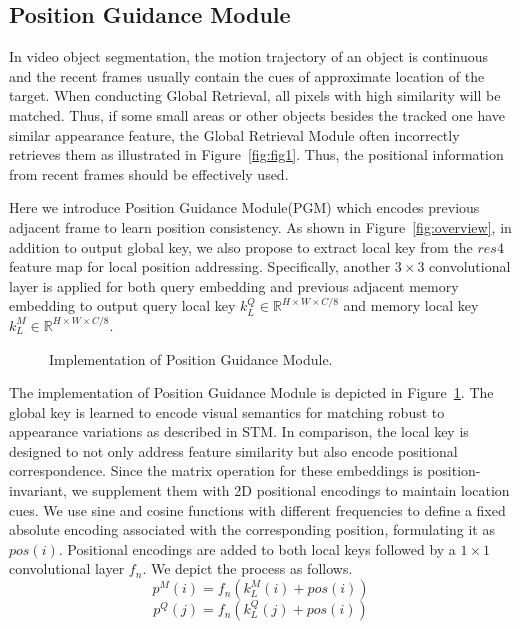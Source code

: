 \documentclass[final]{cvpr}
\begin{document}
\subsection{Position Guidance Module}\label{sec:PGM}
In video object segmentation, the motion trajectory of an object is continuous and the recent frames usually contain the cues of approximate location of the target. When conducting Global Retrieval, all pixels with high similarity will be matched. Thus, if some small areas or other objects besides the tracked one have similar appearance feature, the Global Retrieval Module often incorrectly retrieves them as illustrated in Figure~\ref{fig:fig1}. Thus, the positional information from recent frames should be effectively used.

Here we introduce Position Guidance Module(PGM) which encodes previous adjacent frame to learn position consistency. As shown in Figure~\ref{fig:overview}, in addition to output global key, we also propose to extract local key from the $res4$ feature map for local position addressing. Specifically, another $3{\times}3$ convolutional layer is applied for both query embedding and previous adjacent memory embedding to output query local key $k^{Q}_{L}{\in}{\mathbb{R}}^{H{\times}W{\times}C/8}$ and memory local key $k^{M}_{L}{\in}{\mathbb{R}}^{H{\times}W{\times}C/8}$. 
\begin{figure}[!t]
\begin{center}
	\setlength{\fboxrule}{0pt}
\end{center}
\caption{Implementation of Position Guidance Module.}
\label{fig:pos}
\end{figure}



The implementation of Position Guidance Module is depicted in Figure~\ref{fig:pos}. The global key is learned to encode visual semantics for matching robust to appearance variations as described in STM. In comparison, the local key is designed to not only address feature similarity but also encode positional correspondence. Since the matrix operation for these embeddings is position-invariant, we supplement them with 2D positional encodings\cite{imagetrans,detr} to maintain location cues. We use sine and cosine functions with different frequencies to define a fixed absolute encoding associated with the corresponding position, formulating it as $pos(i)$. Positional encodings are added to both local keys followed by a $1{\times}1$ convolutional layer $f_{n}$. We depict the process as follows.
\begin{equation}
p^{M}(i)=f_{n}(k^{M}_{L}(i)+pos(i))
\end{equation}
\begin{equation}
p^{Q}(j)=f_{n}(k^{Q}_{L}(j)+pos(i))
\end{equation}
\end{document}
